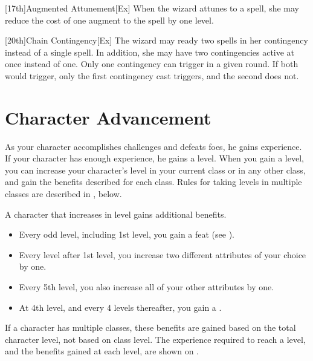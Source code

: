[17th]{Augmented Attunement}[Ex]
When the wizard attunes to a spell, she may reduce the cost of one augment to the spell by one level.

[20th]{Chain Contingency}[Ex]
The wizard may ready two spells in her contingency instead of a single spell.
In addition, she may have two contingencies active at once instead of one.
Only one contingency can trigger in a given round.
If both would trigger, only the first contingency cast triggers, and the second does not.

\section{Character Advancement}\label{Character Advancement}

As your character accomplishes challenges and defeats foes, he gains experience.
If your character has enough experience, he gains a level.
When you gain a level, you can increase your character's level in your current class or in any other class, and gain the benefits described for each class.
Rules for taking levels in multiple classes are described in , below.

A character that increases in level gains additional benefits.
\begin{itemize}
    \item Every odd level, including 1st level, you gain a feat (see ).
    \item Every level after 1st level, you increase two different attributes of your choice by one.
    \item Every 5th level, you also increase all of your other attributes by one.
    \item At 4th level, and every 4 levels thereafter, you gain a .
\end{itemize}

If a character has multiple classes, these benefits are gained based on the total character level, not based on class level.
The experience required to reach a level, and the benefits gained at each level, are shown on .

